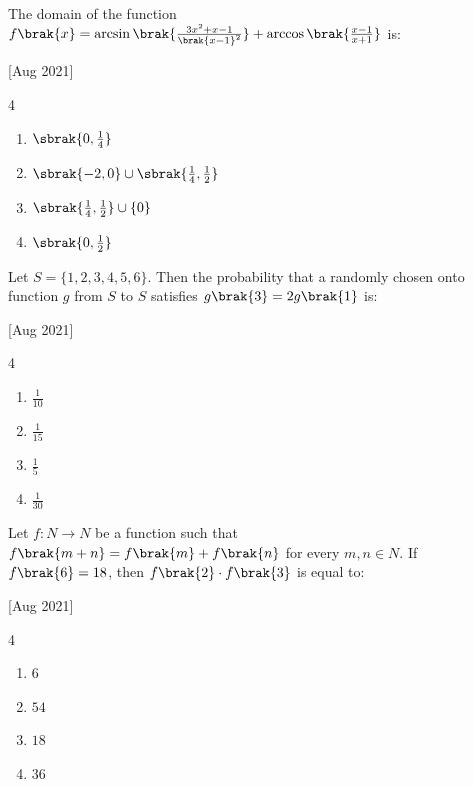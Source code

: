     \item The domain of the function $f\brak{x}=\arcsin\brak{\frac{3x^2+x-1}{\brak{x-1}^2}}+\arccos\brak{\frac{x-1}{x+1}}$ is:
    
    \hfill{[Aug 2021]}

        \begin{multicols}{4}
            \begin{enumerate}
                \item $\sbrak{0, \frac{1}{4}}$
                \item $\sbrak{-2,0}\cup\sbrak{\frac{1}{4}, \frac{1}{2}}$
                \item $\sbrak{\frac{1}{4}, \frac{1}{2}}\cup\{0\}$
                \item $\sbrak{0, \frac{1}{2}}$
            \end{enumerate}
        \end{multicols}

    \item Let $S=\{1,2,3,4,5,6\}$. Then the probability that a randomly chosen onto function $g$ from $S$ to $S$ satisfies $g\brak{3}=2g\brak{1}$ is:
    
    \hfill{[Aug 2021]}

		\begin{multicols}{4}
			\begin{enumerate}
				\item $\frac{1}{10}$
				\item $\frac{1}{15}$
				\item $\frac{1}{5}$
				\item $\frac{1}{30}$
			\end{enumerate}
		\end{multicols}

    \item Let $f:N\to N$ be a function such that $f\brak{m+n}=f\brak{m}+f\brak{n}$ for every $m,n\in N$. If $f\brak{6}=18$, then $f\brak{2}\cdot f\brak{3}$ is equal to:
    
    \hfill{[Aug 2021]}

		\begin{multicols}{4}
			\begin{enumerate}
				\item $6$
				\item $54$
				\item $18$
				\item $36$
			\end{enumerate}
		\end{multicols}
  
